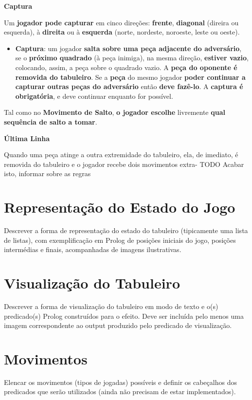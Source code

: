 \documentclass[a4paper]{article}
\begin{document}
\large{\textbf{Captura}}
\begin{small}

Um \textbf{jogador pode capturar} em cinco direções: \textbf{frente}, \textbf{diagonal} (direira ou esquerda), à \textbf{direita} ou à \textbf{esquerda} (norte, nordeste, noroeste, leste ou oeste). 

\begin{itemize}
\item \textbf{Captura}:
um jogador \textbf{salta sobre uma peça adjacente do adversário}, se o \textbf{próximo quadrado} (à peça inimiga), na mesma direção, \textbf{estiver vazio}, colocando, assim, a peça sobre o quadrado vazio. A \textbf{peça do oponente é removida do tabuleiro}. Se a \textbf{peça} do mesmo jogador \textbf{poder continuar a capturar outras peças do adversário} então \textbf{deve fazê-lo}. A \textbf{captura é obrigatória}, e deve continuar enquanto for possível.
\end{itemize}

Tal como no \textbf{Movimento de Salto}, \textbf{o jogador escolhe} livremente \textbf{qual sequência de salto a tomar}.
\end{small}\newline

\large{\textbf{Última Linha}}
\begin{small}

Quando uma peça atinge a outra extremidade do tabuleiro, ela, de imediato, é removida do tabuleiro e o jogador recebe dois movimentos extra- TODO Acabar isto, informar sobre as regras
\end{small}\newline

\section{Representação do Estado do Jogo}

Descrever a forma de representação do estado do tabuleiro (tipicamente uma lista de listas), com exemplificação em Prolog de posições iniciais do jogo, posições intermédias e finais, acompanhadas de imagens ilustrativas.


\section{Visualização do Tabuleiro}

Descrever a forma de visualização do tabuleiro em modo de texto e o(s) predicado(s) Prolog construídos para o efeito.
Deve ser incluída pelo menos uma imagem correspondente ao output produzido pelo predicado de visualização.


\section{Movimentos}

Elencar os movimentos (tipos de jogadas) possíveis e definir os cabeçalhos dos predicados que serão utilizados (ainda não precisam de estar implementados).
\end{document}
